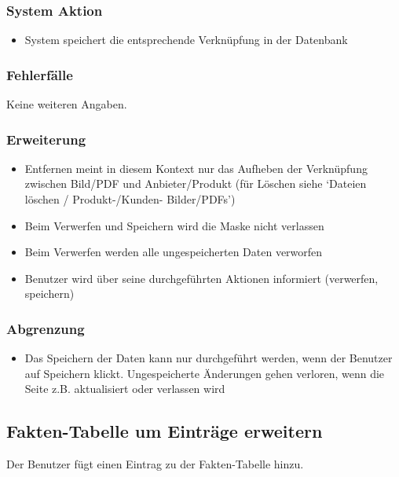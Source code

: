 \documentclass[a4paper,12pt]{article}
\begin{document}
\subsubsection{System Aktion}\label{system-aktion-7}

\begin{itemize}

\item
  System speichert die entsprechende Verknüpfung in der Datenbank
\end{itemize}

\subsubsection{Fehlerfälle}\label{fehlerfalle-7}
Keine weiteren Angaben.

\subsubsection{Erweiterung}\label{erweiterung-7}

\begin{itemize}

\item
  Entfernen meint in diesem Kontext nur das Aufheben der Verknüpfung
  zwischen Bild/PDF und Anbieter/Produkt (für Löschen siehe `Dateien
  löschen / Produkt-/Kunden- Bilder/PDFs')
\item
  Beim Verwerfen und Speichern wird die Maske nicht verlassen
\item
  Beim Verwerfen werden alle ungespeicherten Daten verworfen
\item
  Benutzer wird über seine durchgeführten Aktionen informiert
  (verwerfen, speichern)
\end{itemize}

\subsubsection{Abgrenzung}\label{abgrenzung-7}

\begin{itemize}

\item
  Das Speichern der Daten kann nur durchgeführt werden, wenn der
  Benutzer auf Speichern klickt. Ungespeicherte Änderungen gehen
  verloren, wenn die Seite z.B. aktualisiert oder verlassen wird
\end{itemize}

\clearpage

\subsection{Fakten-Tabelle um Einträge erweitern}\label{benutzer-fugt-einen-eintrag-zu-der-fakten-tabelle-hinzu}
Der Benutzer fügt einen Eintrag zu der Fakten-Tabelle hinzu.
\end{document}
